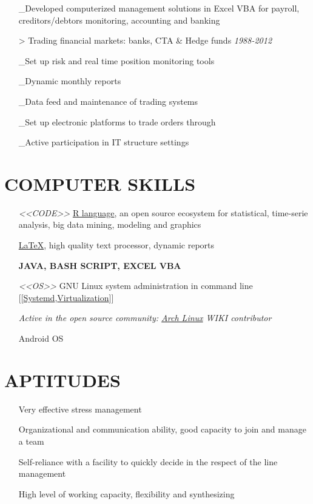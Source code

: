 \documentclass{res}
\begin{document}
\begin{resume}
\begin{enumerate}[leftmargin=0cm]
\_Developed computerized management solutions in Excel VBA for payroll, creditors/\newline debtors monitoring,  accounting and banking
\item[>]Trading financial markets: banks, CTA \& Hedge funds
\hfill \textit{1988-2012}

\_Set up risk and real time position monitoring tools

\_Dynamic monthly reports

\_Data feed and maintenance of trading systems

\_Set up electronic platforms to trade orders through 

\_Active participation in IT structure settings
\end{enumerate}

\section{COMPUTER SKILLS}
\begin{enumerate}[leftmargin=0.5cm]
\item[\emph{<<CODE>>}] \href {http://www.r-project.org/}{R language}, an open source ecosystem for statistical, time-serie analysis, big data mining, modeling and graphics 

\href{http://latex-project.org/intro.html}{\LaTeX}, high quality text processor, dynamic reports 

\textbf{JAVA, BASH SCRIPT, EXCEL VBA}
\item[\emph{<<OS>>}] GNU Linux system administration in command line [[\href {http://www.freedesktop.org/wiki/Software/systemd/}{Systemd},\href {http://libvirt.org/drvqemu.html}{Virtualization}]]

\textsl{Active in the open source community: \href{HTTP://www.archlinux.org/about/}{Arch Linux} WIKI contributor} 

Android OS		
\end{enumerate}


\section{APTITUDES}
\begin{enumerate}[leftmargin=0cm]
\item[\ding{51}]Very effective stress management
\item[\ding{51}]Organizational and communication ability, good capacity to join and manage a team
\item[\ding{51}]Self-reliance with a facility to quickly decide in the respect of the line management
\item[\ding{51}]High level of working capacity, flexibility and synthesizing
\end{enumerate}


\end{resume}
\end{document}
